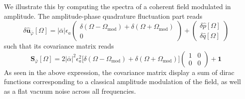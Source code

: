 We illustrate this by computing the spectra of a coherent field modulated in amplitude. The amplitude-phase quadrature fluctuation part reads
\begin{equation}
  \delta \mathbf{\hat{\mathbf u}}_{\bar{\varphi}}[\Omega] = |\bar{\alpha}|\epsilon_a \begin{pmatrix}
  \delta(\Omega - \Omega_{\text{mod}}) +\delta(\Omega + \Omega_{\text{mod}}) \\
  0 
\end{pmatrix}
+ \begin{pmatrix}
  \delta \hat{p}[\Omega] \\
  \delta \hat{q}[\Omega]
\end{pmatrix}
\end{equation}
such that its covariance matrix reads 
\begin{equation}
\mathbf{S}_{\bar{\varphi}}[\Omega] =  2|\bar{\alpha}|^{2}\epsilon_a^{2}
\Big[ \delta(\Omega - \Omega_{\mathrm{mod}})
     + \delta(\Omega + \Omega_{\mathrm{mod}}) \Big] \begin{pmatrix}
  1 & 0 \\
  0 & 0
     \end{pmatrix} + \mathbf{1}
\end{equation}
As seen in the above expression, the covariance matrix display a sum of dirac functions corresponding to a classical amplitude modulation of the field, as well as a flat vacuum noise across all frequencies.
